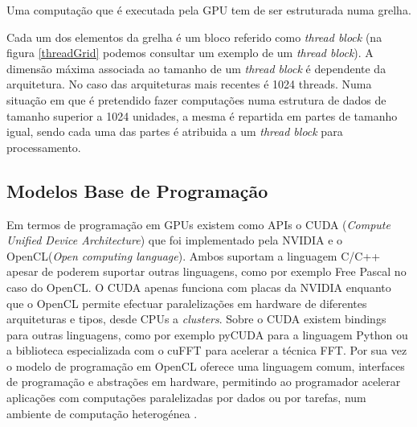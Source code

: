 Uma computação que é executada pela GPU tem de ser estruturada numa grelha. \par Cada um dos elementos da grelha é um bloco referido como \textit{thread block} (na figura \ref{threadGrid} podemos consultar um exemplo de um \textit{thread block}). A dimensão máxima associada ao tamanho de um \textit{thread block} é dependente da arquitetura. No caso das arquiteturas mais recentes é 1024 threads. Numa situação em que é pretendido fazer computações numa estrutura de dados de tamanho superior a 1024 unidades, a mesma é repartida em partes de tamanho igual, sendo cada uma das partes é atribuida a um \textit{thread block} para processamento. 
 
\subsection{Modelos Base de Programação} 
\label{progGPU}
Em termos de programação em GPUs existem como APIs o CUDA (\textit{Compute Unified Device Architecture})\cite{cudaZone} que foi implementado pela NVIDIA e o OpenCL(\textit{Open computing language})\cite{openCL}. Ambos suportam a linguagem C/C++ apesar de poderem suportar outras linguagens, como por exemplo Free Pascal no caso do OpenCL. O CUDA apenas funciona com placas da NVIDIA enquanto que o OpenCL permite efectuar paralelizações em hardware de diferentes arquiteturas e tipos, desde CPUs a \textit{clusters}. Sobre o CUDA existem bindings para outras linguagens, como por exemplo pyCUDA para a linguagem Python ou a biblioteca especializada com o cuFFT\cite{nvidiaFFT} para acelerar a técnica FFT. Por sua vez o modelo de programação em OpenCL oferece uma linguagem comum, interfaces de programação e abstrações em hardware, permitindo ao programador acelerar aplicações com computações paralelizadas por dados ou por tarefas, num ambiente de computação heterogénea \cite{openclProf}.

